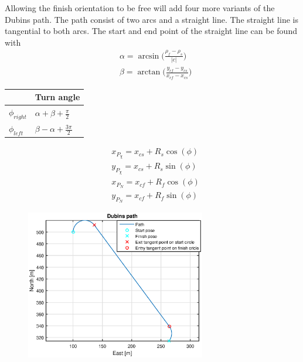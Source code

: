 Allowing the finish orientation to be free will add four more variants of the Dubins path.
The path consist of two arcs and a straight line. The straight line is tangential to both arcs. The start and end point of the straight line can be found with
\begin{subequations}
\begin{align}
& \alpha = \arcsin\big(\frac{\rho_f-\rho_s}{|c|}\big) \\
& \beta = \arctan\big(\frac{y_{cf}-y_{cs}}{x_{cf}-x_{cs}}\big)
\end{align}
\end{subequations}

\begin{table}[H]
\begin{center}
\begin{tabular}{ | l | | l |}
\hline
& \textbf{Turn angle} \\ \hline
$\phi_{right}$ & $\alpha + \beta + \frac{\pi}{2}$ \\
$\phi_{left}$ & $\beta - \alpha + \frac{3\pi}{2}$ \\ \hline
\end{tabular}
\end{center}
\end{table}

\begin{subequations}
\begin{align}
& x_{P_\chi} = x_{cs} + R_s\cos(\phi) \\
& y_{P_\chi} = x_{cs} + R_s\sin(\phi) \\
& x_{P_N} = x_{cf} + R_f\cos(\phi) \\
& y_{P_N} = x_{cf} + R_f\sin(\phi)
\end{align}
\end{subequations}
\begin{figure}[H]
\includegraphics[width=0.7\textwidth]{figs/TheoryPlot/DubinsPath.eps}
\end{figure}